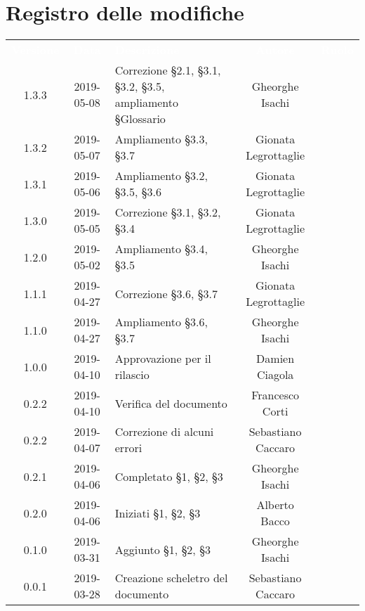 \section*{Registro delle modifiche}
{
	\renewcommand{\arraystretch}{1.5}
	\centering
	\begin{longtable}{ c c C{6cm} c c }
		\textcolor{white}{\textbf{Versione}} & \textcolor{white}{\textbf{Data}} & \textcolor{white}{\textbf{Descrizione}} & \textcolor{white}{\textbf{Autore}} & \textcolor{white}{\textbf{Ruolo}}\\
		
		1.3.3 & 2019-05-08 & Correzione \S2.1, \S3.1, \S3.2, \S3.5, ampliamento \S Glossario & Gheorghe Isachi & \reda{} \\
		
		1.3.2 & 2019-05-07 & Ampliamento \S3.3, \S3.7 & Gionata Legrottaglie & \reda{} \\
		
		1.3.1 & 2019-05-06 & Ampliamento \S3.2, \S3.5, \S3.6 & Gionata Legrottaglie & \reda{} \\
				
		1.3.0 & 2019-05-05 & Correzione \S3.1, \S3.2, \S3.4 & Gionata Legrottaglie & \reda{} \\
				
		1.2.0 & 2019-05-02 & Ampliamento \S3.4, \S3.5 & Gheorghe Isachi & \reda{} \\	
		
		1.1.1 & 2019-04-27 & Correzione \S3.6, \S3.7 & Gionata Legrottaglie & \reda{} \\	
		
		1.1.0 & 2019-04-27 & Ampliamento \S3.6, \S3.7 & Gheorghe Isachi & \reda{} \\
		
		1.0.0 & 2019-04-10 & Approvazione per il rilascio & Damien Ciagola & \RdP{} \\ 
			
		0.2.2 & 2019-04-10 & Verifica del documento & Francesco Corti & \ver{} \\ 
		
		0.2.2 & 2019-04-07 & Correzione di alcuni errori & Sebastiano Caccaro & \reda{} \\ 

		0.2.1 & 2019-04-06 & Completato \S1, \S2, \S3 & Gheorghe Isachi & \reda{} \\
		
		0.2.0 & 2019-04-06 & Iniziati \S1, \S2, \S3 & Alberto Bacco & \reda{} \\
		
		0.1.0 & 2019-03-31 & Aggiunto \S1, \S2, \S3 & Gheorghe Isachi & \reda{} \\
		
		0.0.1 & 2019-03-28 & Creazione scheletro del documento & Sebastiano Caccaro & \reda{}
		
	\end{longtable}

}